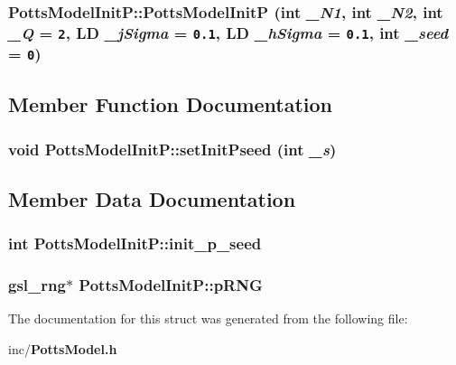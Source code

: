 \subsubsection{\setlength{\rightskip}{0pt plus 5cm}PottsModelInitP::PottsModelInitP (int {\em \_\-N1}, int {\em \_\-N2}, int {\em \_\-Q} = {\tt 2}, {\bf LD} {\em \_\-jSigma} = {\tt 0.1}, {\bf LD} {\em \_\-hSigma} = {\tt 0.1}, int {\em \_\-seed} = {\tt 0})\hspace{0.3cm}{\tt  [inline]}}\label{structPottsModelInitP_da6e72d249ce377e013b20535df3461b}




\subsection{Member Function Documentation}
\subsubsection{\setlength{\rightskip}{0pt plus 5cm}void PottsModelInitP::setInitPseed (int {\em \_\-s})\hspace{0.3cm}{\tt  [inline]}}\label{structPottsModelInitP_f149dcc6fad10c198c9c41cad879b947}




\subsection{Member Data Documentation}
\subsubsection{\setlength{\rightskip}{0pt plus 5cm}int {\bf PottsModelInitP::init\_\-p\_\-seed}}\label{structPottsModelInitP_79d6d88d4ebd7a41e14c98f264049c2e}


\subsubsection{\setlength{\rightskip}{0pt plus 5cm}gsl\_\-rng$\ast$ {\bf PottsModelInitP::pRNG}}\label{structPottsModelInitP_3a7ad4aa95ce6f7fc96b73399aa9b011}




The documentation for this struct was generated from the following file:\begin{CompactItemize}
\item 
inc/{\bf PottsModel.h}\end{CompactItemize}
